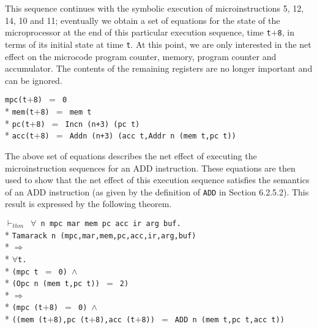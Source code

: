 \begin{normalsize}
This sequence continues with the symbolic execution of
microinstructions 5, 12, 14, 10 and 11;
eventually we obtain
a set of equations for the state of the microprocessor at the
end of this particular execution sequence,
time \verb"t"$+$\verb"8", in terms of its initial state at time \verb"t".
At this point, we are only interested in the net effect on the
microcode program counter, memory, program counter and accumulator.
The contents of the remaining registers are no longer important
and can be ignored.

\hspace*{\fill}
\begin{minipage}{115mm}
\verb"mpc(t"$+$\verb"8) "$=$\verb" 0"\\*
\verb"mem(t"$+$\verb"8) "$=$\verb" mem t"\\*
\verb"pc(t"$+$\verb"8) "$=$\verb" Incn (n+3) (pc t)"\\*
\verb"acc(t"$+$\verb"8) "$=$\verb" Addn (n+3) (acc t,Addr n (mem t,pc t))"
\end{minipage}
\hspace*{\fill}

The above set of equations describes the net effect of executing
the microinstruction sequences for an ADD instruction.
These equations are then used to show that the net effect of
this execution sequence satisfies the semantics of an ADD instruction
(as given by the definition of \verb"ADD" in Section 6.2.5.2).
This result is expressed by the following theorem.

\hspace*{\fill}
\begin{minipage}{17cm}
$\vdash_{thm}$\verb" "$\forall$\verb" n mpc mar mem pc acc ir arg buf."\\*
\verb"Tamarack n (mpc,mar,mem,pc,acc,ir,arg,buf)"\\*
$\Longrightarrow$\\*
$\forall$\verb"t."\\*
\verb"(mpc t "$=$\verb" 0) "$\wedge$\\*
\verb"(Opc n (mem t,pc t)) "$=$\verb" 2)"\\*
$\Longrightarrow$\\*
\verb"(mpc (t"$+$\verb"8) "$=$\verb" 0) "$\wedge$\\*
\verb"((mem (t"$+$\verb"8),pc (t"$+$\verb"8),acc (t"$+$\verb"8)) "$=$\verb" ADD n (mem t,pc t,acc t))"
\end{minipage}
\hspace*{\fill}


\end{normalsize}
